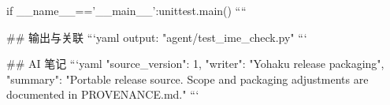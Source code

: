 if __name__=='__main__':unittest.main()
````

## 输出与关联
```yaml
output: "agent/test_ime_check.py"
```

## AI 笔记
```yaml
{"source_version": 1, "writer": "Yohaku release packaging", "summary": "Portable release source. Scope and packaging adjustments are documented in PROVENANCE.md."}
```
